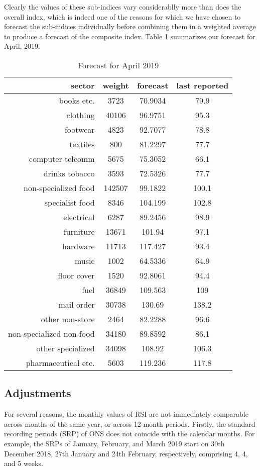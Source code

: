 \documentclass[a4paper,11pt,pdftex,twoside,titlepage]{article}
\begin{document}
Clearly the values of these sub-indices vary considerablly more than
does the overall index, which is indeed one of the reasons for which we have
chosen to forecast the sub-indices individually before combining them
in a weighted average to produce a forecast of the composite index. 
Table \ref{tab:fgt54gg} summarizes our forecast for April, 2019.
\begin{table}[htb!]
  \centering
  \begin{tabular}{r|c|c|c}
    sector & weight & forecast & last reported \\
    \hline \hline
    books etc. & 3723 & 70.9034 & 79.9 \\
    clothing & 40106 & 96.9751 & 95.3 \\
    footwear & 4823 & 92.7077 & 78.8 \\
    textiles & 800 & 81.2297 & 77.7 \\
    computer telcomm & 5675 & 75.3052 & 66.1 \\
    drinks tobacco & 3593 & 72.5326 & 77.7 \\
    non-specialized food & 142507 & 99.1822 & 100.1 \\
    specialist food & 8346 & 104.199 & 102.8 \\
    electrical & 6287 & 89.2456 & 98.9 \\
    furniture & 13671 & 101.94 & 97.1 \\
    hardware & 11713 & 117.427 & 93.4 \\
    music & 1002 & 64.5336 & 64.9 \\
    floor cover & 1520 & 92.8061 & 94.4 \\
    fuel & 36849 & 109.563 & 109 \\
    mail order & 30738 & 130.69 & 138.2 \\
    other non-store & 2464 & 82.2288 & 96.6 \\
    non-specialized non-food & 34180 & 89.8592 & 86.1 \\
    other specialized & 34098 & 108.92 & 106.3 \\
    pharmaceutical etc. & 5603 & 119.236 & 117.8
  \end{tabular}
  \caption{Forecast for April 2019}
  \label{tab:fgt54gg}
\end{table}
\subsection{Adjustments}
\label{sec:adjustments}
For several reasons, the monthly values of RSI are not immediately
comparable across months of the same year, or across 12-month
periods. Firstly, the standard recording periods (SRP) of ONS does not
coincide with the calendar months. For example, the SRPs of January,
February, and March 2019 start on 30th December 2018, 27th January and
24th February, respectively, comprising 4, 4, and 5 weeks.
\end{document}
